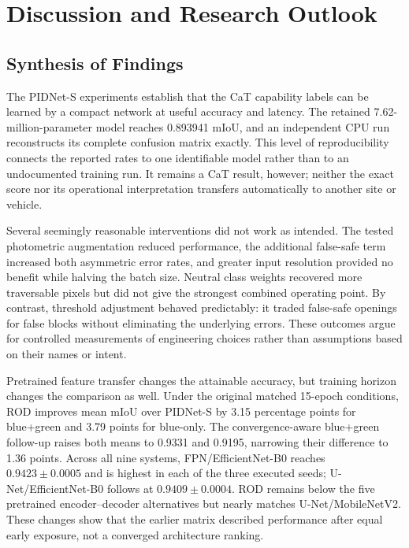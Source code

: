 \chapter{Discussion and Research Outlook}
\label{ch:discussion}

\section{Synthesis of Findings}

The PIDNet-S experiments establish that the CaT capability labels can be
learned by a compact network at useful accuracy and latency. The retained
7.62-million-parameter model reaches 0.893941 mIoU, and an independent CPU run
reconstructs its complete confusion matrix exactly. This level of
reproducibility connects the reported rates to one identifiable model rather
than to an undocumented training run. It remains a CaT result, however;
neither the exact score nor its operational interpretation transfers automatically
to another site or vehicle.

Several seemingly reasonable interventions did not work as intended. The
tested photometric augmentation reduced performance, the additional
false-safe term increased both asymmetric error rates, and greater input
resolution provided no benefit while halving the batch size. Neutral class
weights recovered more traversable pixels but did not give the strongest
combined operating point. By contrast, threshold adjustment behaved
predictably: it traded false-safe openings for false blocks without eliminating
the underlying errors. These outcomes argue for controlled measurements of
engineering choices rather than assumptions based on their names or intent.

Pretrained feature transfer changes the attainable accuracy, but training
horizon changes the comparison as well. Under the original matched 15-epoch
conditions, ROD improves mean mIoU over PIDNet-S by 3.15 percentage points for
blue+green and 3.79 points for blue-only. The convergence-aware blue+green
follow-up raises both means to 0.9331 and 0.9195, narrowing their difference to
1.36 points. Across all nine systems, FPN/EfficientNet-B0 reaches
$0.9423\pm0.0005$ and is highest in each of the three executed seeds;
U-Net/EfficientNet-B0 follows at $0.9409\pm0.0004$. ROD remains below the five
pretrained encoder--decoder alternatives but nearly matches
U-Net/MobileNetV2. These changes show that the earlier matrix described
performance after equal early exposure, not a converged architecture ranking.

